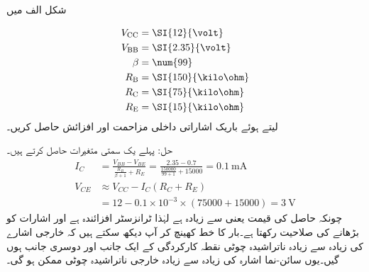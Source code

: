  
شکل  الف میں

\begin{align*}
V_{\textup{CC}}&=\SI{12}{\volt}\\
V_{\textup{BB}}&=\SI{2.35}{\volt}\\
\beta &=\num{99}\\
R_{\textup{B}}&=\SI{150}{\kilo \ohm}\\
R_{\textup {C}}&=\SI{75}{\kilo \ohm}\\
R_{\textup {E}}&=\SI{15}{\kilo \ohm}\
\end{align*}
لیتے ہوئے باریک اشاراتی داخلی مزاحمت   اور افزائش  حاصل کریں۔


حل:	پہلے یک سمتی متغیرات حاصل کرتے ہیں۔
\begin{align*}
I_C&=\frac{V_{BB}-V_{BE}}{\frac{R_B}{\beta+1}+R_E}=\frac{2.35-0.7}{\frac{150000}{99+1}+15000}=\SI{0.1}{\milli \ampere}\\
V_{CE} &\approx V_{CC}-I_C \left(R_C+R_E \right )\\
&=12-0.1 \times 10^{-3} \times \left(75000+15000 \right )=\SI{3}{\volt}
\end{align*}
چونکہ حاصل   کی قیمت  یعنی    سے زیادہ ہے لہٰذا ٹرانزسٹر افزائندہ ہے اور اشارات کو بڑھانے کی صلاحیت رکھتا ہے۔بار کا خط کھینچ کر آپ دیکھ سکتے ہیں کہ خارجی اشارے کی زیادہ سے زیادہ ناتراشیدہ چوٹی نقطہ کارکردگی کے ایک جانب  اور دوسری جانب  ہوں گیں۔یوں سائن-نما اشارہ کی زیادہ سے زیادہ خارجی ناتراشیدہ چوٹی  ممکن ہو گی۔ 

